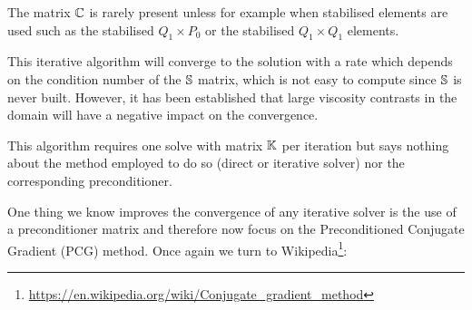 \begin{remark}
The matrix ${\mathbb{C}}$ is rarely present unless for example when stabilised elements are used 
such as the stabilised $Q_1\times P_0$ or the stabilised $Q_1\times Q_1$ elements.
\end{remark}

This iterative algorithm will converge to the solution with a rate which depends on 
the condition number of the ${\mathbb{S}}$ matrix, which is not easy to compute since 
${\mathbb{S}}$ is never built. However, it has been established that large viscosity contrasts in the domain 
will have a negative impact on the convergence. 

\begin{remark} 
This algorithm requires one solve with matrix ${\mathbb{K}}$ per iteration 
but says nothing about the method employed to do so (direct or iterative solver)
nor the corresponding preconditioner.
\end{remark} 

One thing we know improves the convergence of any iterative solver is the use of a 
preconditioner matrix and therefore now focus on the Preconditioned Conjugate Gradient (PCG) method.
Once again we turn to Wikipedia\footnote{\url{https://en.wikipedia.org/wiki/Conjugate_gradient_method}}:

